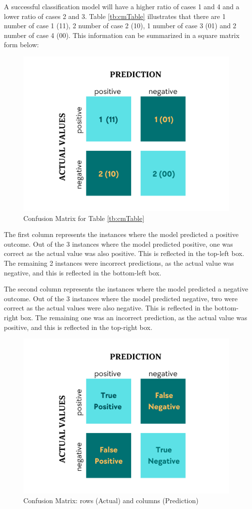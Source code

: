 A successful classification model will have a higher ratio of cases 1 and 4 and a lower ratio of cases 2 and 3. Table \ref{tb:cmTable} illustrates that there are 1 number of case 1 (11), 2 number of case 2 (10), 1 number of case 3 (01) and 2 number of case 4 (00). This information can be summarized in a square matrix form below:

\begin{figure}[!h]
  \centering
  \includegraphics[width=9 cm]{CM_eg.png}
  \caption{Confusion Matrix for Table \ref{tb:cmTable}}
  \label{fig:cm_eg}
\end{figure}

The first column represents the instances where the model predicted a positive outcome. Out of the 3 instances where the model predicted positive, one was correct as the actual value was also positive. This is reflected in the top-left box. The remaining 2 instances were incorrect predictions, as the actual value was negative, and this is reflected in the bottom-left box.

The second column represents the instances where the model predicted a negative outcome. Out of the 3 instances where the model predicted negative, two were correct as the actual values were also negative. This is reflected in the bottom-right box. The remaining one was an incorrect prediction, as the actual value was positive, and this is reflected in the top-right box.

\begin{figure}[!h]
  \centering
  \includegraphics[width=8 cm]{Classifier_CM.png}
  \caption{Confusion Matrix: rows (Actual) and columns (Prediction)}
  \label{fig:cls_cm}
\end{figure}


